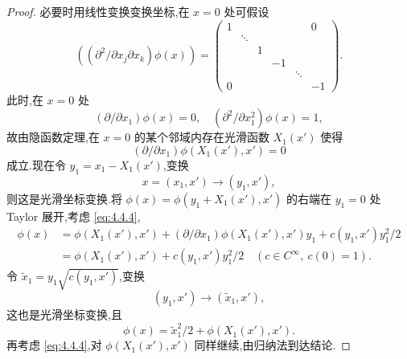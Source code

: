 \begin{proof}
必要时用线性变换变换坐标,在 $x = 0$ 处可假设
\begin{equation*}
\left((\partial^{2}/\partial x_{j}\partial x_{k})\phi(x)\right) = \left(\begin{array}{cccccc}
1 & & & & & 0 \\
& \ddots & & & & \\
& & 1 & & & \\
& & & -1 & & \\
& & & & \ddots & \\
0 & & & & & -1
\end{array}\right).
\end{equation*}
此时,在 $x = 0$ 处
\begin{equation*}
(\partial/\partial x_{1})\phi(x) = 0, \quad (\partial^{2}/\partial x_{1}^{2})\phi(x) = 1,
\end{equation*}
故由隐函数定理,在 $x = 0$ 的某个邻域内存在光滑函数 $X_{1}(x')$ 使得
\begin{equation}
(\partial/\partial x_{1})\phi(X_{1}(x'), x') = 0\tag{4.4.4}
\label{eq:4.4.4}\end{equation}
成立.现在令 $y_{1} = x_{1} - X_{1}(x')$,变换
\begin{equation*}
x = (x_{1}, x') \to (y_{1}, x'),
\end{equation*}
则这是光滑坐标变换.将 $\phi(x) = \phi(y_{1} + X_{1}(x'), x')$ 的右端在 $y_{1} = 0$ 处 Taylor 展开,考虑 \eqref{eq:4.4.4},
\begin{equation}
\begin{aligned}
\phi(x) & = \phi(X_{1}(x'), x') + (\partial/\partial x_{1})\phi(X_{1}(x'), x')y_{1} + c(y_{1}, x')y_{1}^{2}/2 \\
& = \phi(X_{1}(x'), x') + c(y_{1}, x')y_{1}^{2}/2 \quad (c \in C^{\infty},\ c(0) = 1).
\end{aligned}
\end{equation}
令 $\tilde{x}_{1} = y_{1}\sqrt{c(y_{1}, x')}$,变换
\begin{equation*}
(y_{1}, x') \to (\tilde{x}_{1}, x'),
\end{equation*}
这也是光滑坐标变换,且
\begin{equation*}
\phi(x) = \tilde{x}_{1}^{2}/2 + \phi(X_{1}(x'), x').
\end{equation*}
再考虑 \eqref{eq:4.4.4},对 $\phi(X_{1}(x'), x')$ 同样继续,由归纳法到达结论.
\end{proof}
